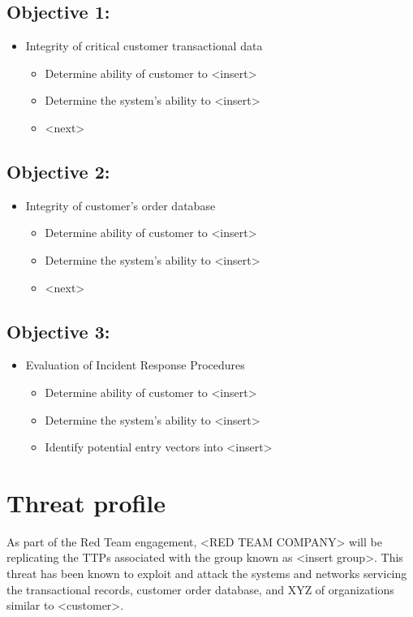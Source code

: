 \documentclass[12pt,letterpaper]{article}
\begin{document}
\subsection{Objective 1:}
\begin{itemize}
    \item Integrity of critical customer transactional data
    \begin{itemize}
        \item Determine ability of customer to <insert>
        \item Determine the system's ability to <insert>
        \item <next>
    \end{itemize}
\end{itemize}

\subsection{Objective 2:}
\begin{itemize}
    \item Integrity of customer's order database
    \begin{itemize}
        \item Determine ability of customer to <insert>
        \item Determine the system's ability to <insert>
        \item <next>
    \end{itemize}
\end{itemize}

\subsection{Objective 3:}
\begin{itemize}
    \item Evaluation of Incident Response Procedures
    \begin{itemize}
        \item Determine ability of customer to <insert>
        \item Determine the system's ability to <insert>
        \item Identify potential entry vectors into <insert>
    \end{itemize}
\end{itemize}

\section{Threat profile}
As part of the Red Team engagement, <RED TEAM COMPANY> will be replicating the TTPs associated with the group known as <insert group>. This threat has been known to exploit and attack the systems and networks servicing the transactional records, customer order database, and XYZ of organizations similar to <customer>.
\end{document}
